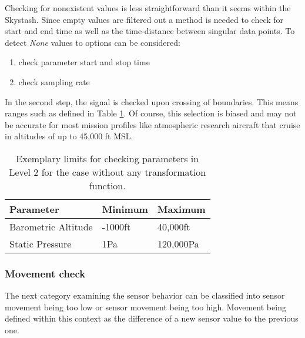 Checking for nonexistent values is less straightforward than it seems within the Skystash. Since empty values are filtered out a method is needed to check for start and end time as well as the time-distance between singular data points. To detect \textit{None} values to options can be considered:
\begin{enumerate}
    \item check parameter start and stop time
    \item check sampling rate
\end{enumerate}
In the second step, the signal is checked upon crossing of boundaries. This means ranges such as defined in Table \ref{tab:level_2_range}. Of course, this selection is biased and may not be accurate for most mission profiles like atmospheric research aircraft that cruise in altitudes of up to 45,000 ft MSL.

\begin{table}[]
    \centering
    \caption[Exemplary limits for checking parameters in Level 2]{Exemplary limits for checking parameters in Level 2 for the case without any transformation function.}
    \begin{tabular}{@{}lll@{}}
        \toprule
        Parameter           & Minimum & Maximum   \\ \midrule
        Barometric Altitude & -1000ft & 40,000ft  \\
        Static Pressure     & 1Pa     & 120,000Pa \\ \bottomrule
    \end{tabular}
    \label{tab:level_2_range}
\end{table}

\subsubsection{Movement check}
\label{chap:4-level_2_movement}
The next category examining the sensor behavior can be classified into sensor movement being too low or sensor movement being too high. Movement being defined within this context as the difference of a new sensor value to the previous one.

